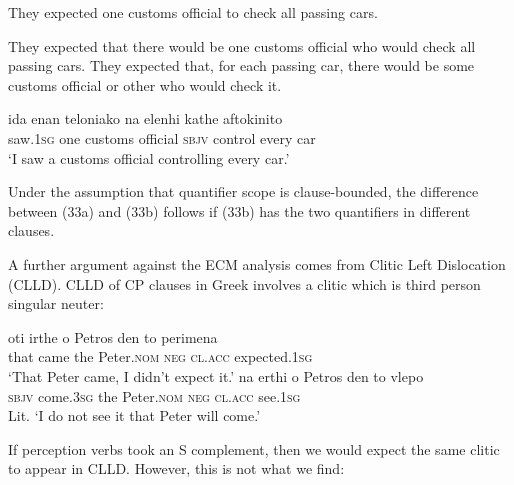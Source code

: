 \documentclass[output=paper]{langsci/langscibook}
\begin{document}
\ea%
    \label{ex:alexiadou:38}
    \ea They expected one customs official to check all passing cars.\\
    \begin{xlisti}
    \ex They expected that there would be one customs official who would         check all passing cars.
    \ex They expected that, for each passing car, there would be some           customs official or other who would check it.  
    \end{xlisti}
    \ex 
    \gll ida          enan teloniako            na       elenhi   kathe  aftokinito\\
        saw{}.\textsc{1sg}   one   {customs official}  \textsc{sbjv} control  every  car\\
    \glt ‘I saw a customs official controlling every car.’
    \begin{xlisti}
    \end{xlisti}
    \z
\z

Under the assumption that quantifier scope is clause-bounded, the difference between (33a) and (33b) follows if (33b) has the two quantifiers in different clauses. 

  A further argument against the ECM analysis comes from Clitic Left Dislocation (CLLD). CLLD of CP clauses in Greek involves a clitic which is third person singular neuter:

\ea%
    \label{ex:alexiadou:39}
    \ea
    \gll oti   irthe   o     Petros      den  to       perimena\\
          that  came the  Peter.\textsc{nom}  \textsc{neg}  \textsc{cl.acc} expected{}.\textsc{1sg}\\
    \glt ‘That Peter came, I didn't expect it.’
    \ex
    \gll na    erthi         o   Petros       den   to      vlepo\\
         \textsc{sbjv} come{}.\textsc{3sg} the Peter.\textsc{nom}  \textsc{neg}  \textsc{cl.acc} see{}.\textsc{1sg}\\
    \glt Lit. ‘I do not see it that Peter will come.’
    \z
\z    
 
If perception verbs took an S complement, then we would expect the same clitic to appear in CLLD. However, this is not what we find:
\end{document}
